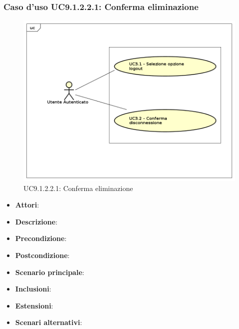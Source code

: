 				\subsubsection{Caso d'uso UC9.1.2.2.1: Conferma eliminazione}
				\label{UC9.1.2.2.1}
				\begin{figure}[h]
					\centering
				\includegraphics[scale=0.7,keepaspectratio]{UML/UC9.png}
					\caption{UC9.1.2.2.1: Conferma eliminazione}
				\end{figure}
				\FloatBarrier
				\begin{itemize}
					\item \textbf{Attori}: 
					\item \textbf{Descrizione}: 
					\item \textbf{Precondizione}: 
					\item \textbf{Postcondizione}: 
					\item \textbf{Scenario principale}:
					\item \textbf{Inclusioni}:
					\item \textbf{Estensioni}:
					\item \textbf{Scenari alternativi}:
				\end{itemize}
				

